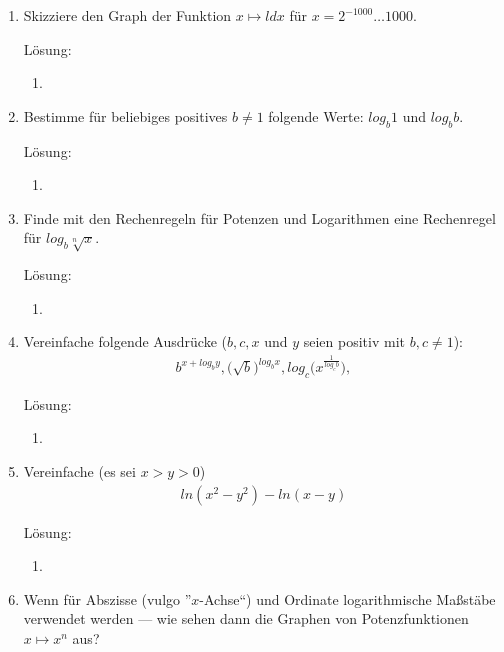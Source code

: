 \documentclass[../main.tex]{subfiles}
\begin{document}
\begin{enumerate}
	\item Skizziere den Graph der Funktion \(
	      x \mapsto ld x
	      \) für \(
	      x = 2^{-1000} \dots 1000
	      \).

	      Lösung:
	      \begin{enumerate}
		      \item
	      \end{enumerate}
	\item Bestimme für beliebiges positives \(
	      b \neq 1
	      \) folgende Werte: \(
	      log_b 1
	      \) und \(
	      log_b b
	      \).

	      Lösung:
	      \begin{enumerate}
		      \item
	      \end{enumerate}
	\item Finde mit den Rechenregeln für Potenzen und Logarithmen eine Rechenregel für \(
	      log_b \sqrt[n]{x}
	      \).

	      Lösung:
	      \begin{enumerate}
		      \item
	      \end{enumerate}
	\item Vereinfache folgende Ausdrücke (\(
	      b, c, x
	      \) und \(
	      y
	      \) seien positiv mit \(
	      b,c \neq 1
	      \)):
	      \begin{align*}
		      b^{x + log_b y},
		      \Big( \sqrt{b} \Big)^{log_b x},
		      log_c \Big( x^{ \frac{1}{log_c b}} \Big),
	      \end{align*}

	      Lösung:
	      \begin{enumerate}
		      \item
	      \end{enumerate}
	\item Vereinfache (es sei \(
	      x > y > 0
	      \))
	      \begin{align*}
		      ln(x^2 - y^2) - ln(x - y)
	      \end{align*}

	      Lösung:
	      \begin{enumerate}
		      \item
	      \end{enumerate}
	\item Wenn für Abszisse (vulgo ”\(
	      x
	      \)-Achse“) und Ordinate logarithmische Maßstäbe verwendet werden —
	      wie sehen dann die Graphen von Potenzfunktionen \(
	      x \mapsto x^n
	      \) aus?


\end{enumerate}
\end{document}
